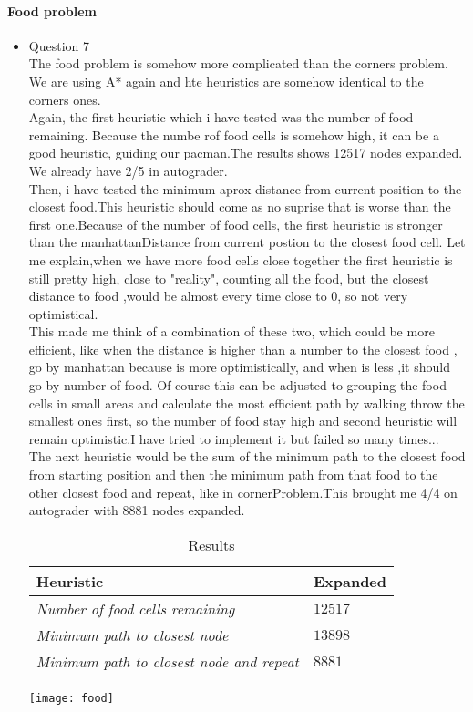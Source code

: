 \paragraph{Food problem}
\begin{itemize}
\item{Question 7}\\

	\tab The food problem is somehow more complicated than the corners problem. We are using A* again and hte heuristics are somehow identical to the corners ones.\\
	\tab Again, the first heuristic which i have tested was the number of food remaining. Because the numbe rof food cells is somehow high, it can be a good heuristic, guiding our pacman.The results shows 12517 nodes expanded. We already have 2/5 in autograder.\\
	\tab Then, i have tested the minimum aprox distance from current position to the closest food.This heuristic should come as no suprise that is worse than the first one.Because of the number of food cells, the first heuristic is stronger than the manhattanDistance from current postion to the closest food cell. Let me explain,when we have more food cells close together the first heuristic is still pretty high, close to "reality", counting all the food, but the closest distance to food ,would be almost every time close to 0, so not very optimistical.\\ 
	\tab This made me think of a combination of these two, which could be more efficient, like when the distance is higher than a number to the closest food , go by manhattan because is more optimistically, and when is less ,it should go by number of food. Of course this can be adjusted to grouping the food cells in small areas and calculate the most efficient path by walking throw the smallest ones first, so the number of food stay high  and second heuristic will remain optimistic.I have tried to implement it  but failed so many times...\\
	\tab The next heuristic would be the sum of the minimum path to the closest food from starting position and then the minimum path from that food to the other closest food and repeat, like in cornerProblem.This brought me 4/4 on autograder with 8881 nodes expanded.\\

\begin{table}
\begin{center}
\caption{Results}
\begin{tabular}{|p{11cm}|p{2cm}|}\hline
\textbf{Heuristic} &\textbf{Expanded}  \\ \hline
{\it Number of food cells remaining}  & $12517$\\ \hline
{\it Minimum path to closest node} & $13898$  \\ \hline
{\it Minimum path to closest node and repeat} & $8881$  \\ \hline
\end{tabular}
\end{center}
\label{tab:first}
\end{table}

\texttt{[image: food]}
\end{itemize}